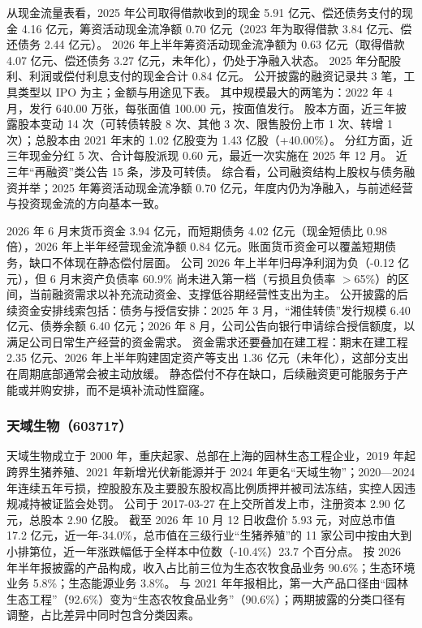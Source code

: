  从现金流量表看，2025 年公司取得借款收到的现金 5.91 亿元、偿还债务支付的现金 4.16 亿元，筹资活动现金流净额 0.70 亿元（2023 年为取得借款 3.84 亿元、偿还债务 2.44 亿元）。 2026 年上半年筹资活动现金流净额为 0.63 亿元（取得借款 4.07 亿元、偿还债务 3.27 亿元，未年化），仍处于净融入状态。 2025 年分配股利、利润或偿付利息支付的现金合计 0.84 亿元。 公开披露的融资记录共 3 笔，工具类型以 IPO 为主；金额与用途见下表。 其中规模最大的两笔为：2022 年 4 月，发行 640.00 万张，每张面值 100.00 元，按面值发行。 股本方面，近三年披露股本变动 14 次（可转债转股 8 次、其他 3 次、限售股份上市 1 次、转增 1 次）；总股本由 2021 年末的 1.02 亿股变为 1.43 亿股（+40.00\%）。 分红方面，近三年现金分红 5 次、合计每股派现 0.60 元，最近一次实施在 2025 年 12 月。 近三年“再融资”类公告 15 条，涉及可转债。 综合看，公司融资结构上股权与债务融资并举；2025 年筹资活动现金流净额 0.70 亿元，年度内仍为净融入，与前述经营与投资现金流的方向基本一致。

 2026 年 6 月末货币资金 3.94 亿元，而短期债务 4.02 亿元（现金短债比 0.98 倍），2026 年上半年经营现金流净额 0.84 亿元。账面货币资金可以覆盖短期债务，缺口不体现在静态偿付层面。 公司 2026 年上半年归母净利润为负（-0.12 亿元），但 6 月末资产负债率 60.9\% 尚未进入第一档（亏损且负债率 $>$65\%）的区间，当前融资需求以补充流动资金、支撑低谷期经营性支出为主。 公开披露的后续资金安排线索包括：债务与授信安排：2025 年 3 月，“湘佳转债”发行规模 6.40 亿元、债券余额 6.40 亿元；2026 年 8 月，公司公告向银行申请综合授信额度，以满足公司日常生产经营的资金需求。 资金需求还要叠加在建工程：期末在建工程 2.35 亿元、2026 年上半年购建固定资产等支出 1.36 亿元（未年化），这部分支出在周期底部通常会被主动放缓。 静态偿付不存在缺口，后续融资更可能服务于产能或并购安排，而不是填补流动性窟窿。




\subsubsection{天域生物（603717）}
\label{co:603717}

 天域生物成立于 2000 年，重庆起家、总部在上海的园林生态工程企业，2019 年起跨界生猪养殖、2021 年新增光伏新能源并于 2024 年更名“天域生物”；2020—2024 年连续五年亏损，控股股东及主要股东股权高比例质押并被司法冻结，实控人因违规减持被证监会处罚。 公司于 2017-03-27 在上交所首发上市，注册资本 2.90 亿元，总股本 2.90 亿股。 截至 2026 年 10 月 12 日收盘价 5.93 元，对应总市值 17.2 亿元，近一年-34.0\%，总市值在三级行业“生猪养殖”的 11 家公司中按由大到小排第位，近一年涨跌幅低于全样本中位数（-10.4\%）23.7 个百分点。 按 2026 年半年报披露的产品构成，收入占比前三位为生态农牧食品业务 90.6\%；生态环境业务 5.8\%；生态能源业务 3.8\%。 与 2021 年年报相比，第一大产品口径由“园林生态工程”（92.6\%）变为“生态农牧食品业务”（90.6\%）；两期披露的分类口径有调整，占比差异中同时包含分类因素。

